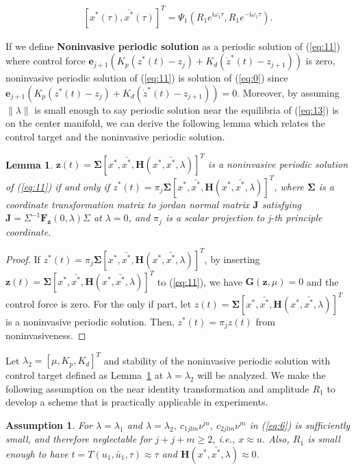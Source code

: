 \documentclass[openacc]{rsproca_new}%
\def\vec#1{\ensuremath{\mathbf{#1}}}
\newcommand{\Eref}[1]{(\ref{#1})}
\newcommand{\Lref}[1]{Lemma~\ref{#1}}
\newtheorem{lemma}{\bf Lemma}[section]
\newtheorem{assumption}{\bf Assumption}[section]
\begin{document}
\begin{align}\label{eq:16}
    [x^*(\tau),\bar {x^*}(\tau)]^T=\Psi_1(R_1e^{\textrm{i}\omega_1 \tau},R_1e^{-\textrm{i}\omega_1 \tau}).
\end{align}

\noindent If we define \textbf{Noninvasive periodic solution} as a periodic solution of \Eref{eq:11} where control force $\vec{e}_{j+1}(K_p(z^*(t)-z_j)+K_d(\dot z^*(t)-z_{j+1}))$ is zero, noninvasive periodic solution of \Eref{eq:11} is solution of \Eref{eq:0} since $\vec{e}_{j+1}(K_p(z^*(t)-z_j)+K_d(\dot z^*(t)-z_{j+1}))=0$. Moreover, by assuming $\| \lambda \|$ is small enough to say periodic solution near the equilibria of \Eref{eq:13} is on the center manifold, we can derive the following lemma which relates the control target and the noninvasive periodic solution.

\begin{lemma}\label{l1}
$\vec{z}(t)=\vec{\Sigma}[x^*,\bar {x^*},\vec H(x^*,\bar {x^*},\lambda)]^T$ is a noninvasive periodic solution of \Eref{eq:11} if and only if $z^*(t)=\pi_j \vec{\Sigma}[x^*,\bar {x^*},\vec H(x^*,\bar {x^*},\lambda)]^T$,
where $\vec{\Sigma}$ is a coordinate transformation matrix to jordan normal matrix $\vec{J}$ satisfying $\vec{J}=\Sigma^{-1}\vec{F}_\vec{z}(0,\lambda) \Sigma$ at $\lambda=0$, and $\pi_j$ is a scalar projection to j-th principle coordinate.
\end{lemma}

\begin{proof}
If $z^*(t)=\pi_j \vec{\Sigma}[x^*,\bar {x^*},\vec H(x^*,\bar {x^*},\lambda)]^T$, by inserting $\vec z(t)=\vec{\Sigma}[x^*,\bar {x^*},\vec H(x^*,\bar {x^*},\lambda)]^T$ to \Eref{eq:11}, we have $\vec{G}(\vec{z},\mu)=0$ and the control force is zero. For the only if part, let $z(t)=\vec{\Sigma}[x^*,\bar {x^*},\vec H(x^*,\bar {x^*},\lambda)]^T$ is a noninvasive periodic solution. Then, $z^*(t)=\pi_j z(t)$ from noninvasiveness.
\end{proof}

\noindent Let $\lambda_2=[\mu,K_p,K_d]^T$ and stability of the noninvasive periodic solution with control target defined as \Lref{l1} at $\lambda=\lambda_2$ will be analyzed. We make the following assumption on the near identity transformation and amplitude $R_1$ to develop a scheme that is practically applicable in experiments.

\begin{assumption}\label{a1}
For $\lambda=\lambda_1$ and $\lambda=\lambda_2$, $c_{1jlm}\nu^m$, $c_{2jlm}\nu^m$ in \Eref{eq:6} is sufficiently small, and therefore neglectable for $j+j+m\geq 2$, i.e., $x \approx u$. Also, $R_1$ is small enough to have $t=T(u_1,\bar u_1,\tau) \approx \tau$ and $\vec H(x^*,\bar {x^*},\lambda) \approx 0$.
\end{assumption}
\end{document}

